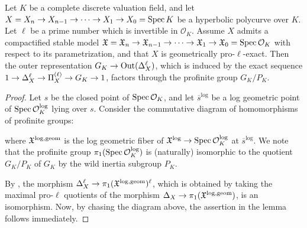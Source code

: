 \begin{lem}\label{TamenessOfOuterRepresentationOfGeometricallyProEllExactHyperbolicPolycurvesAdmittingCompactifiedStableModels}
  Let $K$ be a complete discrete valuation field, and let $X = X_n \to X_{n - 1} \to \cdots \to X_1 \to X_0 = \mathrm{Spec} \, K$ be a hyperbolic polycurve over $K$. Let $\ell$ be a prime number which is invertible in $\mathcal{O}_K$. Assume $X$ admits a compactified stable model $\mathfrak{X} = \mathfrak{X}_n \to \mathfrak{X}_{n - 1} \to \cdots \to \mathfrak{X}_1 \to \mathfrak{X}_0 = \mathrm{Spec} \, \mathcal{O}_K$ with respect to its parametrization, and that $X$ is geometrically pro-$\ell$-exact. Then the outer representation $G_K \to \mathrm{Out}(\Delta_{X}^\ell)$, which is induced by the exact sequence $1 \to \Delta_{X}^\ell \to \Pi^{(\ell)}_{X} \to G_K \to 1$, factors through the profinite group $G_K/P_K$.
\end{lem}
\begin{proof}
  Let $s$ be the closed point of $\mathrm{Spec} \, \mathcal{O}_K$, and let $\overline{s}^\log$ be a log geometric point of $\mathrm{Spec} \, \mathcal{O}_K^{\mathrm{log}}$ lying over $s$. Consider the commutative diagram of homomorphisms of profinite groups:
  \begin{center}
  \end{center}
  where $\mathfrak{X}^{\mathrm{log}, \mathrm{geom}}$ is the log geometric fiber of $\mathfrak{X}^{\mathrm{log}} \to \mathrm{Spec} \, \mathcal{O}_K^{\mathrm{log}}$ at $\overline{s}^\log$. We note that the profinite group $\pi_1(\mathrm{Spec} \, \mathcal{O}_K^{\mathrm{log}})$ is (naturally) isomorphic to the quotient $G_K/P_K$ of $G_K$ by the wild inertia subgroup $P_K$.
  
  By \cite[Theorem 1.4]{Kisin}, the morphism $\Delta_{X}^\ell \to \pi_1(\mathfrak{X}^{\mathrm{log}, \mathrm{geom}})^\ell$, which is obtained by taking the maximal pro-$\ell$ quotients of the morphism $\Delta_{X} \to \pi_1(\mathfrak{X}^{\mathrm{log}, \mathrm{geom}})$, is an isomorphism. Now, by chasing the diagram above, the assertion in the lemma follows immediately.
\end{proof}

